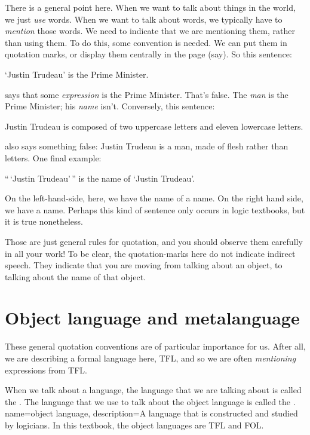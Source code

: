 There is a general point here. When we want to talk about things in the world, we just \emph{use} words. When we want to talk about words, we typically have to \emph{mention} those words. We need to indicate that we are mentioning them, rather than using them. To do this, some convention is needed. We can put them in quotation marks, or display them centrally in the page (say). So this sentence:
	\begin{ebullet}
		\item `Justin Trudeau' is the Prime Minister.
	\end{ebullet}
says that some \emph{expression} is the Prime Minister. That's false. The \emph{man} is the Prime Minister; his \emph{name} isn't. Conversely, this sentence:
	\begin{ebullet}
		\item Justin Trudeau is composed of two uppercase letters and eleven lowercase letters.
	\end{ebullet}
also says something false: Justin Trudeau is a man, made of flesh rather than letters. One final example:
	\begin{ebullet}
		\item ``\,`Justin Trudeau'\,'' is the name of `Justin Trudeau'.
	\end{ebullet} 
On the left-hand-side, here, we have the name of a name. On the right hand side, we have a name. Perhaps this kind of sentence only occurs in logic textbooks, but it is true nonetheless. 

Those are just general rules for quotation, and you should observe them carefully in all your work! To be clear, the quotation-marks here do not indicate indirect speech. They indicate that you are moving from talking about an object, to talking about the name of that object.


\section{Object language and metalanguage}
These general quotation conventions are of particular importance for us. After all, we are describing a formal language here, TFL, and so we are often \emph{mentioning} expressions from TFL. 

When we talk about a language, the language that we are talking about is called the . The language that we use to talk about the object language is called the .
\label{def.metalanguage}
{
name=object language,
description={A language that is constructed and studied by logicians. In this textbook,
 the object languages are TFL and FOL.}
}

